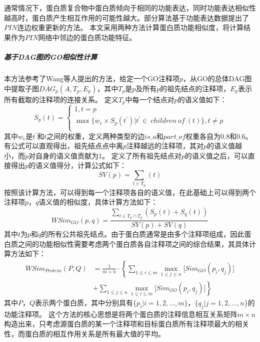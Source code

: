 通常情况下，蛋白质复合物中蛋白质倾向于相同的功能表达，同时功能表达相似性越高时，蛋白质产生相互作用的可能性越大。部分算法\cite{ulitsky_identification_2007,jianxing_feng_max-flow-based_2011}基于功能表达数据提出了$PIN$连边权重更新的方法。
本文采用两种方法计算蛋白质功能相似度，将计算结果作为$PIN$网络中邻边的蛋白质功能特征。

\subparagraph*{基于DAG图的GO相似性计算}

本方法参考了Wang等人\cite{wang_new_2007}提出的方法，给定一个GO注释项$p$，从GO的总体DAG图中提取子图$DAG_p(A,T_p,E_p)$，其中$T_p$是$p$及所有$p$的祖先结点的注释项，$E_p$表示所有截取的注释项的连接关系。
定义$T_p$中每一个结点对$p$的语义值如下：
\begin{equation}
    \label{equ:feat:go:SAT}
    S_p(t)=\left\{\begin{array}{l}
        1,t=p                                                                        \\
        \max {\{ w_e\times S_p(t^\prime )| t^\prime\in ~children~of~(t) \} },t\neq p \\
    \end{array}\right.
\end{equation}
其中$w_e$是$t^\prime$和$t$之间的权重，定义两种类型的边$is\_a$和$part\_of$权重各自为0.8和0.6。有公式可以直观得出，祖先结点点中离$p$注释越远的注释项，其对$p$的语义值越小，而$p$对自身的语义值贡献为1。
定义了所有祖先结点对$p$的语义值之后，可以直接得出$p$的语义值得分，计算公式如下：
\begin{equation}
    \label{equ:feat:go:SVA}
    SV(p)=\sum_{t \in T_p}(t)
\end{equation}
按照该计算方法，可以得到每一个注释项各自的语义值，在此基础上可以得到两个注释项$p$，$q$语义值的相似度，具体计算方法如下：
\begin{equation}
    \label{equ:feat:go:SimItemWang}
    WSim_{GO}(p,q)=\frac{\sum_{t \in T_p \cap T_q}(S_p(t)+S_q(t))}{SV(p)+SV(q)}
\end{equation}
其中$t$为$p$和$q$的所有公共祖先结点。由于蛋白质通常是由多个注释项组成，因此蛋白质之间的功能相似性需要考虑两个蛋白质各自注释项之间的综合结果，其具体计算方法如下：
\begin{equation}
    \label{equ:feat:go:SimProteinWang}
    \begin{aligned}
        WSim_{Protein}(P,Q) & =\frac{1}{m+n}\cdot \left\{\sum_{1\leq i\leq m}{\max_{1\leq j\leq n}[{Sim_{GO}(p_i,q_j)}}]\right. \\
                            & \left.+\sum_{1\leq j\leq n}{\max_{1\leq i\leq m}[{Sim_{GO}(p_i,q_j)}}]\right\}
    \end{aligned}
\end{equation}
其中$P$，$Q$表示两个蛋白质，其中分别具有$\{p_i| i=1,2,\dots,m\}$，$\{q_j| j=1,2,\dots,n\}$的功能注释项。
这个方法的核心思想是将两个蛋白质的注释信息相互关系矩阵$m\times n$构造出来，只考虑源蛋白质的某一个注释项和目标蛋白质所有注释项最大的相关性，而蛋白质的相互作用关系是所有最大值的平均。

